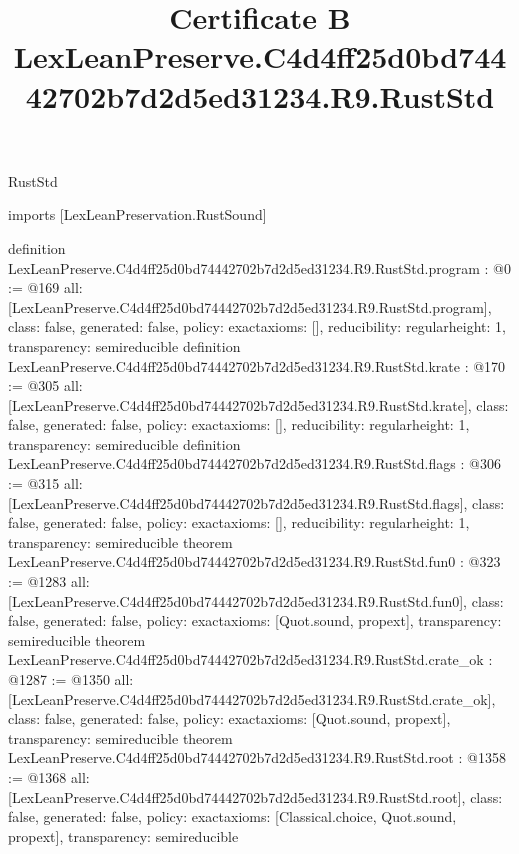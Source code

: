 \begin{lexlean}{RustStd}
\title{Certificate B LexLeanPreserve.C4d4ff25d0bd74442702b7d2d5ed31234.R9.RustStd}
\begin{coremodule}
imports [LexLeanPreservation.RustSound]

definition LexLeanPreserve.C4d4ff25d0bd74442702b7d2d5ed31234.R9.RustStd.program : @0 := @169 {
  all: [LexLeanPreserve.C4d4ff25d0bd74442702b7d2d5ed31234.R9.RustStd.program],
  class: false,
  generated: false,
  policy: exact{axioms: []},
  reducibility: regular{height: 1},
  transparency: semireducible
}
definition LexLeanPreserve.C4d4ff25d0bd74442702b7d2d5ed31234.R9.RustStd.krate : @170 := @305 {
  all: [LexLeanPreserve.C4d4ff25d0bd74442702b7d2d5ed31234.R9.RustStd.krate],
  class: false,
  generated: false,
  policy: exact{axioms: []},
  reducibility: regular{height: 1},
  transparency: semireducible
}
definition LexLeanPreserve.C4d4ff25d0bd74442702b7d2d5ed31234.R9.RustStd.flags : @306 := @315 {
  all: [LexLeanPreserve.C4d4ff25d0bd74442702b7d2d5ed31234.R9.RustStd.flags],
  class: false,
  generated: false,
  policy: exact{axioms: []},
  reducibility: regular{height: 1},
  transparency: semireducible
}
theorem LexLeanPreserve.C4d4ff25d0bd74442702b7d2d5ed31234.R9.RustStd.fun0 : @323 := @1283 {
  all: [LexLeanPreserve.C4d4ff25d0bd74442702b7d2d5ed31234.R9.RustStd.fun0],
  class: false,
  generated: false,
  policy: exact{axioms: [Quot.sound, propext]},
  transparency: semireducible
}
theorem LexLeanPreserve.C4d4ff25d0bd74442702b7d2d5ed31234.R9.RustStd.crate_ok : @1287 := @1350 {
  all: [LexLeanPreserve.C4d4ff25d0bd74442702b7d2d5ed31234.R9.RustStd.crate_ok],
  class: false,
  generated: false,
  policy: exact{axioms: [Quot.sound, propext]},
  transparency: semireducible
}
theorem LexLeanPreserve.C4d4ff25d0bd74442702b7d2d5ed31234.R9.RustStd.root : @1358 := @1368 {
  all: [LexLeanPreserve.C4d4ff25d0bd74442702b7d2d5ed31234.R9.RustStd.root],
  class: false,
  generated: false,
  policy: exact{axioms: [Classical.choice, Quot.sound, propext]},
  transparency: semireducible
}


\end{coremodule}
\end{lexlean}
